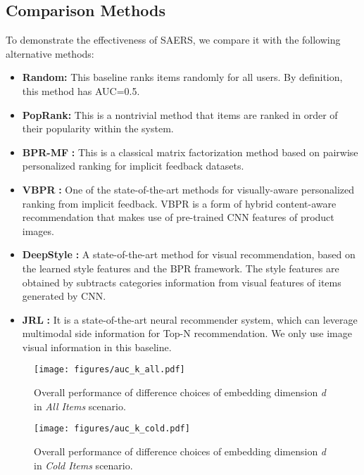 \documentclass{article}
\begin{document}
\subsection{Comparison Methods}
To demonstrate the effectiveness of SAERS, we compare it with the following alternative methods:
\begin{itemize}[leftmargin=*,itemsep=2.5pt]
		\setlength{\itemsep}{0pt}
	\setlength{\parsep}{0pt}
	\setlength{\parskip}{0pt}
  \item \textbf{Random:} This baseline ranks items randomly for all users. By definition, this method has AUC=0.5.
  \item \textbf{PopRank:} This is a nontrivial method that items are ranked in order of their popularity within the system.
  \item \textbf{BPR-MF} \cite{rendle2009bpr}\textbf{:} This is a classical matrix factorization method based on  pairwise personalized ranking for implicit feedback datasets.
  \item \textbf{VBPR} \cite{he2016vbpr}\textbf{:} One of the state-of-the-art methods for visually-aware personalized ranking from implicit feedback. VBPR is a form of hybrid content-aware recommendation that makes use of pre-trained CNN features of product images.
  \item \textbf{DeepStyle} \cite{liu2017deepstyle}\textbf{:} A state-of-the-art method for visual recommendation, based on the learned style features and the BPR framework. The style features are obtained by subtracts categories information from visual features of items generated by CNN.
  \item \textbf{JRL} \cite{zhang2017joint}\textbf{:} It is a state-of-the-art neural recommender system, which can leverage multimodal side information for Top-N recommendation. We only use image visual information in this baseline.
\end{itemize}









\begin{figure}
\texttt{[image: figures/auc\_k\_all.pdf]}\caption{Overall performance of difference choices of embedding dimension \textit{d} in \textit{All Items} scenario.}\label{fig:auc_k_all}
\end{figure}

\begin{figure}
\texttt{[image: figures/auc\_k\_cold.pdf]}\caption{Overall performance of difference choices of embedding dimension \textit{d} in \textit{Cold Items} scenario.}\bigskip
\label{fig:auc_k_cold}
\end{figure}
\end{document}
